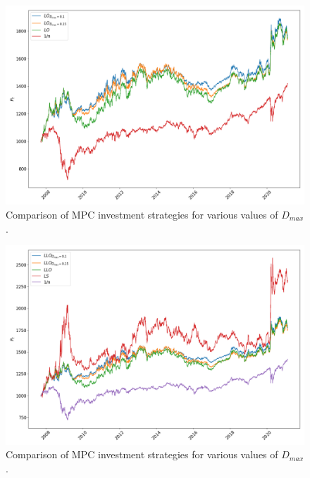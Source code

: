 \begin{figure}[H]
    \centering
    \includegraphics[width=1\textwidth]{analysis/portfolio_exercise/images/mle/port_vals_lo.png}
    \caption[Comparison of MPC investment strategies for various values of $D_{max}$]{Comparison of MPC investment strategies for various values of $D_{max}$.}
    \label{fig:MPC_port_vals_lo}
\end{figure}

\begin{figure}[H]
    \centering
    \includegraphics[width=1\textwidth]{analysis/portfolio_exercise/images/mle/port_vals_llo.png}
    \caption[Comparison of MPC investment strategies for various values of $D_{max}$]{Comparison of MPC investment strategies for various values of $D_{max}$.}
    \label{fig:MPC_port_vals_ls}
\end{figure}


